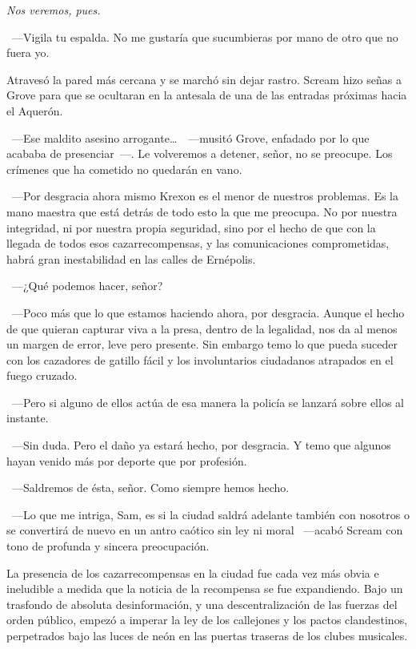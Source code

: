 \emph{Nos veremos, pues.}

~---Vigila tu espalda. No me gustaría que sucumbieras por mano de otro que no fuera yo.

Atravesó la pared más cercana y se marchó sin dejar rastro. Scream hizo señas a Grove para que se ocultaran en la antesala de una de las entradas próximas hacia el Aquerón.

~---Ese maldito asesino arrogante\dots\ ~---musitó Grove, enfadado por lo que acababa de presenciar~---. Le volveremos a detener, señor, no se preocupe. Los crímenes que ha cometido no quedarán en vano.

~---Por desgracia ahora mismo Krexon es el menor de nuestros problemas. Es la mano maestra que está detrás de todo esto la que me preocupa. No por nuestra integridad, ni por nuestra propia seguridad, sino por el hecho de que con la llegada de todos esos cazarrecompensas, y las comunicaciones comprometidas, habrá gran inestabilidad en las calles de Ernépolis.

~---¿Qué podemos hacer, señor?

~---Poco más que lo que estamos haciendo ahora, por desgracia. Aunque el hecho de que quieran capturar viva a la presa, dentro de la legalidad, nos da al menos un margen de error, leve pero presente. Sin embargo temo lo que pueda suceder con los cazadores de gatillo fácil y los involuntarios ciudadanos atrapados en el fuego cruzado.

~---Pero si alguno de ellos actúa de esa manera la policía se lanzará sobre ellos al instante.

~---Sin duda. Pero el daño ya estará hecho, por desgracia. Y temo que algunos hayan venido más por deporte que por profesión.

~---Saldremos de ésta, señor. Como siempre hemos hecho.

~---Lo que me intriga, Sam, es si la ciudad saldrá adelante también con nosotros o se convertirá de nuevo en un antro caótico sin ley ni moral ~---acabó Scream con tono de profunda y sincera preocupación.

\parbreak
La presencia de los cazarrecompensas en la ciudad fue cada vez más obvia e ineludible a medida que la noticia de la recompensa se fue expandiendo. Bajo un trasfondo de absoluta desinformación, y una descentralización de las fuerzas del orden público, empezó a imperar la ley de los callejones y los pactos clandestinos, perpetrados bajo las luces de neón en las puertas traseras de los clubes musicales.

